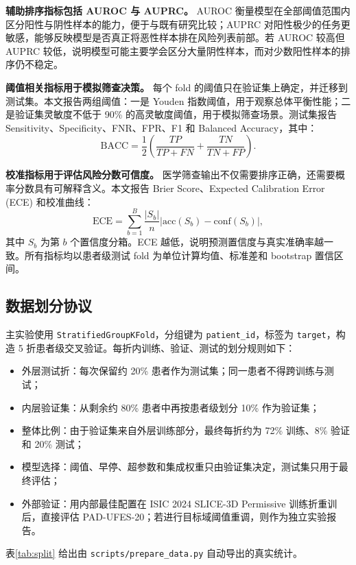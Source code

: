 \documentclass[UTF8,a4paper,10pt,twocolumn,fontset=fandol]{ctexart}
\newcommand{\isic}{ISIC 2024 SLICE-3D Permissive}
\newcommand{\pad}{PAD-UFES-20}
\begin{document}
\textbf{辅助排序指标包括 AUROC 与 AUPRC。} AUROC 衡量模型在全部阈值范围内区分阳性与阴性样本的能力，便于与既有研究比较；AUPRC 对阳性极少的任务更敏感，能够反映模型是否真正将恶性样本排在风险列表前部。若 AUROC 较高但 AUPRC 较低，说明模型可能主要学会区分大量阴性样本，而对少数阳性样本的排序仍不稳定。

\textbf{阈值相关指标用于模拟筛查决策。} 每个 fold 的阈值只在验证集上确定，并迁移到测试集。本文报告两组阈值：一是 Youden 指数阈值，用于观察总体平衡性能；二是验证集灵敏度不低于 90\% 的高灵敏度阈值，用于模拟筛查场景。测试集报告 Sensitivity、Specificity、FNR、FPR、F1 和 Balanced Accuracy，其中：
\begin{equation}
    \mathrm{BACC}=\frac{1}{2}\left(\frac{TP}{TP+FN}+\frac{TN}{TN+FP}\right).
\end{equation}

\textbf{校准指标用于评估风险分数可信度。} 医学筛查输出不仅需要排序正确，还需要概率分数具有可解释含义。本文报告 Brier Score、Expected Calibration Error (ECE) 和校准曲线：
\begin{equation}
    \mathrm{ECE}=\sum_{b=1}^{B}\frac{|S_b|}{n}\left|\mathrm{acc}(S_b)-\mathrm{conf}(S_b)\right|,
\end{equation}
其中 $S_b$ 为第 $b$ 个置信度分箱。ECE 越低，说明预测置信度与真实准确率越一致。所有指标均以患者级测试 fold 为单位计算均值、标准差和 bootstrap 置信区间。


\subsection{数据划分协议}
主实验使用 \texttt{StratifiedGroupKFold}，分组键为 \texttt{patient\_id}，标签为 \texttt{target}，构造 5 折患者级交叉验证。每折内训练、验证、测试的划分规则如下：
\begin{itemize}
    \item 外层测试折：每次保留约 20\% 患者作为测试集；同一患者不得跨训练与测试；
    \item 内层验证集：从剩余约 80\% 患者中再按患者级划分 10\% 作为验证集；
    \item 整体比例：由于验证集来自外层训练部分，最终每折约为 72\% 训练、8\% 验证和 20\% 测试；
    \item 模型选择：阈值、早停、超参数和集成权重只由验证集决定，测试集只用于最终评估；
    \item 外部验证：用内部最佳配置在 \isic{} 训练折重训后，直接评估 \pad{}；若进行目标域阈值重调，则作为独立实验报告。
\end{itemize}
表\ref{tab:split} 给出由 \texttt{scripts/prepare\_data.py} 自动导出的真实统计。
\end{document}
